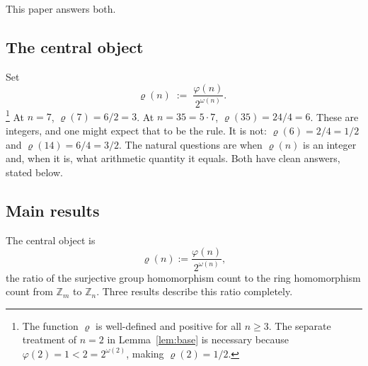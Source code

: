 \documentclass[12pt]{amsart}
\theoremstyle{bluehead}
\theoremstyle{orangehead}
\theoremstyle{greenhead}
\newcommand{\Z}{\mathbb{Z}}
\renewcommand{\phi}{\varphi}
\begin{document}
This paper answers both.

\subsection*{The central object}

Set
\begin{equation}\label{def:rho}
  \varrho(n) \;:=\; \frac{\phi(n)}{2^{\omega(n)}}.^{\phantom{1}}
\end{equation}
\footnote{The function $\varrho$ is well-defined and positive for all $n\ge3$.
  The separate treatment of $n=2$ in Lemma~\ref{lem:base} is necessary
  because $\phi(2)=1<2=2^{\omega(2)}$, making $\varrho(2)=1/2$.}
At $n=7$, $\varrho(7)=6/2=3$.
At $n=35=5\cdot7$, $\varrho(35)=24/4=6$.
These are integers, and one might expect that to be the rule.
It is not: $\varrho(6)=2/4=1/2$ and $\varrho(14)=6/4=3/2$.
The natural questions are when $\varrho(n)$ is an integer
and, when it is, what arithmetic quantity it equals.
Both have clean answers, stated below.

\subsection*{Main results}

The central object is
\begin{equation}\label{eq:rho}
  \varrho(n):=\frac{\phi(n)}{2^{\omega(n)}},
\end{equation}
the ratio of the surjective group homomorphism count to the ring
homomorphism count from $\Z_m$ to $\Z_n$.  Three results describe
this ratio completely.
\end{document}
